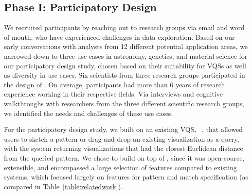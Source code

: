 \subsection{Phase I: Participatory Design}
\par We recruited participants by reaching out to research groups via email and word of mouth, who have experienced challenges in data exploration. Based on our early conversations with analysts from 12 different potential application areas, we narrowed down to three use cases in astronomy, genetics, and material science for our participatory design study, chosen based on their suitability for VQSs as well as diversity in use cases. Six scientists from three research groups participated in the design of \zv. On average, participants had more than 6 years of research experience working in their respective fields. Via interviews and cognitive walkthroughs with researchers from the three different scientific research groups, we identified the needs and challenges of these use cases. 
\par For the participatory design study, we built on an existing VQS, \zv~\cite{Siddiqui2017,Siddiqui2017VLDB}, that allowed users to sketch a pattern or drag-and-drop an existing visualization as a query, with the system returning visualizations that had the closest Euclidean distance from the queried pattern. We chose to build on top of \zv, since it was open-source, extensible, and encompassed a large selection of features compared to existing systems, which focused largely on features for pattern and match specification (as compared in Table~\ref{table:relatedwork}).

